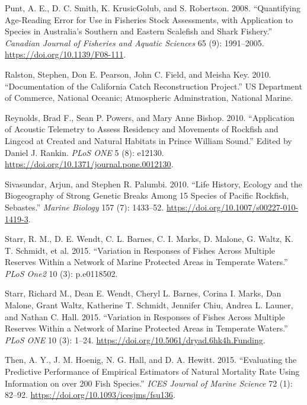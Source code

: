 \documentclass[11pt,
  english,
  letterpaper,
]{article}
\newlength{\cslhangindent}
\newenvironment{CSLReferences}[2] %
 {%
  \setlength{\parindent}{0pt}
  \ifodd #1 \everypar{\setlength{\hangindent}{\cslhangindent}}\ignorespaces\fi
  \ifnum #2 > 0
  \setlength{\parskip}{#2\baselineskip}
  \fi
 }%
 {}
\begin{document}
\begin{CSLReferences}{1}{0}
\leavevmode{}%
Punt, A. E., D. C. Smith, K. KrusicGolub, and S. Robertson. 2008. {``Quantifying Age-Reading Error for Use in Fisheries Stock Assessments, with Application to Species in {Australia}'s Southern and Eastern Scalefish and Shark Fishery.''} \emph{Canadian Journal of Fisheries and Aquatic Sciences} 65 (9): 1991--2005. \url{https://doi.org/10.1139/F08-111}.

\leavevmode{}%
Ralston, Stephen, Don E. Pearson, John C. Field, and Meisha Key. 2010. {``Documentation of the {California} Catch Reconstruction Project.''} US Department of Commerce, National Oceanic; Atmospheric Adminstration, National Marine.

\leavevmode{}%
Reynolds, Brad F., Sean P. Powers, and Mary Anne Bishop. 2010. {``Application of {Acoustic} {Telemetry} to {Assess} {Residency} and {Movements} of {Rockfish} and {Lingcod} at {Created} and {Natural} {Habitats} in {Prince} {William} {Sound}.''} Edited by Daniel J. Rankin. \emph{PLoS ONE} 5 (8): e12130. \url{https://doi.org/10.1371/journal.pone.0012130}.

\leavevmode{}%
Sivasundar, Arjun, and Stephen R. Palumbi. 2010. {``Life History, Ecology and the Biogeography of Strong Genetic Breaks Among 15 Species of {Pacific} Rockfish, {Sebastes}.''} \emph{Marine Biology} 157 (7): 1433--52. \url{https://doi.org/10.1007/s00227-010-1419-3}.

\leavevmode{}%
Starr, R. M., D. E. Wendt, C. L. Barnes, C. I. Marks, D. Malone, G. Waltz, K. T. Schmidt, et al. 2015. {``Variation in Responses of Fishes Across Multiple Reserves Within a Network of Marine Protected Areas in Temperate Waters.''} \emph{PLoS One2} 10 (3): p.e0118502.

\leavevmode{}%
Starr, Richard M., Dean E. Wendt, Cheryl L. Barnes, Corina I. Marks, Dan Malone, Grant Waltz, Katherine T. Schmidt, Jennifer Chiu, Andrea L. Launer, and Nathan C. Hall. 2015. {``Variation in Responses of Fishes Across Multiple Reserves Within a Network of Marine Protected Areas in Temperate Waters.''} \emph{PLoS ONE} 10 (3): 1--24. \url{https://doi.org/10.5061/dryad.6hk4h.Funding}.

\leavevmode{}%
Then, A. Y., J. M. Hoenig, N. G. Hall, and D. A. Hewitt. 2015. {``Evaluating the Predictive Performance of Empirical Estimators of Natural Mortality Rate Using Information on over 200 Fish Species.''} \emph{ICES Journal of Marine Science} 72 (1): 82--92. \url{https://doi.org/10.1093/icesjms/fsu136}.


\end{CSLReferences}
\end{document}

